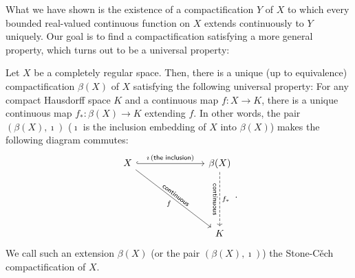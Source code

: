 What we have shown is the existence of a compactification $Y$ of $X$ to which every bounded real-valued continuous function on $X$ extends continuously to $Y$ uniquely.
Our goal is to find a compactification satisfying a more general property, which turns out to be a universal property:
\begin{thm}
    Let $X$ be a completely regular space.
    Then, there is a unique (up to equivalence) compactification $\beta(X)$ of $X$ satisfying the following universal property:
    For any compact Hausdorff space $K$ and a continuous map $f: X\rightarrow K$, there is a unique continuous map $f_*: \beta(X)\rightarrow K$ extending $f$.
    In other words, the pair $(\beta(X), \imath)$ ($\imath$ is the inclusion embedding of $X$ into $\beta(X)$) makes the following diagram commutes:
    \begin{equation*}
        \begin{tikzcd}[row sep=2.0cm, column sep=2.5cm]
            X
            \arrow[dr, "\textsf{continuous}"{sloped}, "f"']
            \arrow[r, "\imath\,(\textsf{the inclusion})", hook] &
            \beta(X)
            \arrow[d, "\textsf{continuous}"'{sloped}, "f_*", dashed] \\
            & K
        \end{tikzcd}.
    \end{equation*}
    We call such an extension $\beta(X)$ (or the pair $(\beta(X), \imath)$) the Stone-C\v{e}ch compactification of $X$.
\end{thm}

